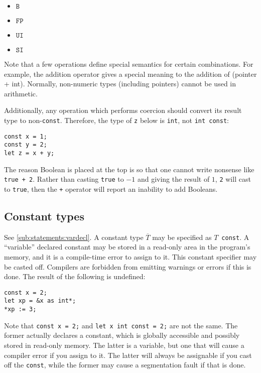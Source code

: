 \documentclass{article}
\newcommand{\R}[1]{\mathtt{#1}}
\begin{document}
\begin{itemize}
\item{$\R{B}$}
\item{$\R{FP}$}
\item{$\R{UI}$}
\item{$\R{SI}$}
\end{itemize}

Note that a few operations define special semantics for certain combinations.
For example, the addition operator gives a special meaning to the addition of
(pointer + int). Normally, non-numeric types (including pointers)
cannot be used in arithmetic.

Additionally, any operation which performs coercion should convert its
result type to non-\texttt{const}. Therefore, the type of \texttt{z} below
is \texttt{int}, not \texttt{int~const}:

\begin{verbatim}
const x = 1;
const y = 2;
let z = x + y;
\end{verbatim}

The reason Boolean is placed at the top is so that one cannot write nonsense
like \texttt{true~+~2}. Rather than casting \texttt{true} to $-1$ and giving
the result of $1$, \texttt{2} will cast to \texttt{true}, then the \texttt{+}
operator will report an inability to add Booleans.

\subsection{Constant types}
\label{sub:types:const}
See \ref{sub:statements:vardecl}.
A constant type $\overline{T}$ may be specified as $T$~\texttt{const}. A
``variable'' declared constant may be stored in a read-only area in the
program's memory, and it is a compile-time error to assign to it.
This constant specifier may be casted off. Compilers are forbidden from
emitting warnings or errors if this is done. The result of the following
is undefined:
\begin{verbatim}
const x = 2;
let xp = &x as int*;
*xp := 3;
\end{verbatim}

Note that \texttt{const~x~=~2;} and \texttt{let~x~int~const~=~2;} are not the
same. The former actually declares a constant, which is globally accessible and
possibly stored in read-only memory. The latter is a variable, but one that will
cause a compiler error if you assign to it. The latter will always be assignable
if you cast off the \texttt{const}, while the former may cause a segmentation
fault if that is done.
\end{document}

